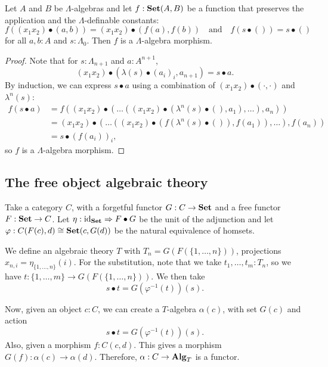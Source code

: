 \begin{lemma}\label{lem:make-is-lambda-algebra-morphism}
  Let $ A $ and $ B $ be $ \Lambda $-algebras and let $ f: \mathbf{Set}(A, B) $ be a function that preserves the application and the $ \Lambda $-definable constants:
  \[ f((x_1 x_2) \bullet (a, b)) = (x_1 x_2) \bullet (f(a), f(b)) \quad \text{and} \quad f(s \bullet ()) = s \bullet () \]
  for all $ a, b: A $ and $ s: \Lambda_0 $. Then $ f $ is a $ \Lambda $-algebra morphism.
\end{lemma}
\begin{proof}
  Note that for $ s: \Lambda_{n + 1} $ and $ a: A^{n + 1} $,
  \[ (x_1 x_2) \bullet (\lambda(s) \bullet (a_i)_i, a_{n + 1}) = s \bullet a. \]
  By induction, we can express $ s \bullet a $ using a combination of $ (x_1 x_2) \bullet (\cdot, \cdot) $ and $ \lambda^n(s) $:
  \begin{align*}
    f(s \bullet a) &= f((x_1 x_2) \bullet (\dots ((x_1 x_2) \bullet (\lambda^n(s) \bullet (), a_1), \dots), a_n))\\
    &= (x_1 x_2) \bullet (\dots ((x_1 x_2) \bullet (f(\lambda^n(s) \bullet ()), f(a_1)), \dots), f(a_n))\\
    &= s \bullet (f(a_i))_i,
  \end{align*}
  so $ f $ is a $ \Lambda $-algebra morphism.
\end{proof}

\subsection{The free object algebraic theory}

\begin{example}
  Take a category $ C $, with a forgetful functor $ G: C \to \mathbf{Set} $ and a free functor $ F: \mathbf{Set} \to C $. Let $ \eta: \text{id}_{\mathbf{Set}} \Rightarrow F \bullet G $ be the unit of the adjunction and let $ \varphi: C(F(c), d) \cong \mathbf{Set}(c, G(d)) $ be the natural equivalence of homsets.

  We define an algebraic theory $ T $ with $ T_n = G(F(\{ 1, \dots, n \})) $, projections $ x_{n, i} = \eta_{\{1, \dots, n\}}(i) $. For the substitution, note that we take $ t_1, \dots, t_m: T_n $, so we have $ t: \{ 1, \dots, m \} \to G(F(\{ 1, \dots, n \})) $. We then take
  \[ s \bullet t = G(\varphi^{-1}(t))(s). \]

  Now, given an object $ c: C $, we can create a $ T $-algebra $ \alpha(c) $, with set $ G(c) $ and action
  \[ s \bullet t = G(\varphi^{-1}(t))(s). \]
  Also, given a morphism $ f: C(c, d) $. This gives a morphism $ G(f): \alpha(c) \to \alpha(d) $. Therefore, $ \alpha: C \to \mathbf{Alg}_{T} $ is a functor.
\end{example}

